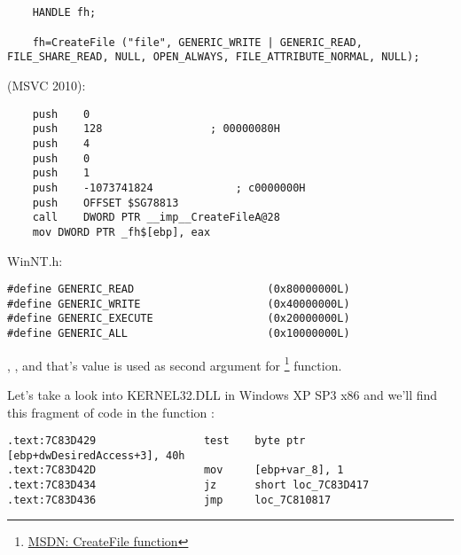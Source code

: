﻿\subsection{}


\begin{lstlisting}
	HANDLE fh;

	fh=CreateFile ("file", GENERIC_WRITE | GENERIC_READ, FILE_SHARE_READ, NULL, OPEN_ALWAYS, FILE_ATTRIBUTE_NORMAL, NULL);
\end{lstlisting}

 (MSVC 2010):

\begin{lstlisting}
	push	0
	push	128					; 00000080H
	push	4
	push	0
	push	1
	push	-1073741824				; c0000000H
	push	OFFSET $SG78813
	call	DWORD PTR __imp__CreateFileA@28
	mov	DWORD PTR _fh$[ebp], eax
\end{lstlisting}

 WinNT.h:

\begin{lstlisting}
#define GENERIC_READ                     (0x80000000L)
#define GENERIC_WRITE                    (0x40000000L)
#define GENERIC_EXECUTE                  (0x20000000L)
#define GENERIC_ALL                      (0x10000000L)
\end{lstlisting}

, 
, 
{and that's value is used as second argument for} \footnote{\href{http://msdn.microsoft.com/en-us/library/aa363858(VS.85).aspx}{MSDN: CreateFile function}} function.


{Let's take a look into KERNEL32.DLL in Windows XP SP3 x86 and we'll find
this fragment of code in the function :}

\begin{lstlisting}
.text:7C83D429                 test    byte ptr [ebp+dwDesiredAccess+3], 40h
.text:7C83D42D                 mov     [ebp+var_8], 1
.text:7C83D434                 jz      short loc_7C83D417
.text:7C83D436                 jmp     loc_7C810817
\end{lstlisting}

